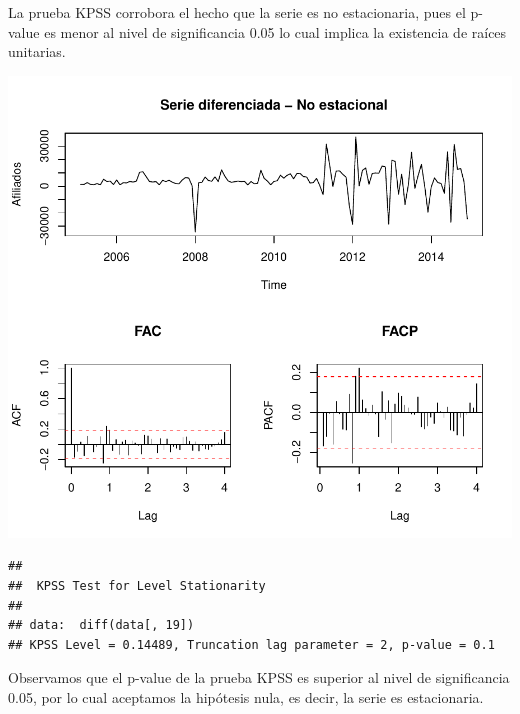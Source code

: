 \documentclass[11pt,a4paper,oneside]{article}\usepackage[]{graphicx}\usepackage[]{color}
\makeatletter
\def\maxwidth{ %
  \ifdim\Gin@nat@width>\linewidth
    \linewidth
  \else
    \Gin@nat@width
  \fi
}
\newenvironment{kframe}{%
 \def\at@end@of@kframe{}%
 \ifinner\ifhmode%
  \def\at@end@of@kframe{\end{minipage}}%
  \begin{minipage}{\columnwidth}%
 \fi\fi%
 \def\FrameCommand##1{\hskip\@totalleftmargin \hskip-\fboxsep
 \colorbox{shadecolor}{##1}\hskip-\fboxsep
     \hskip-\linewidth \hskip-\@totalleftmargin \hskip\columnwidth}%
 \MakeFramed {\advance\hsize-\width
   \@totalleftmargin\z@ \linewidth\hsize
   \@setminipage}}%
 {\par\unskip\endMakeFramed%
 \at@end@of@kframe}
\newenvironment{knitrout}{}{} %
\makeatother
\begin{document}
La prueba KPSS corrobora el hecho que la serie es no estacionaria, pues el p-value es menor al nivel de significancia 0.05 lo cual implica  la existencia de raíces unitarias.

\begin{knitrout}
\color{fgcolor}

{\centering \includegraphics[width=\maxwidth]{figure/unnamed-chunk-11-1} 

}



\end{knitrout}

\begin{knitrout}
\color{fgcolor}\begin{kframe}
\begin{verbatim}
## 
## 	KPSS Test for Level Stationarity
## 
## data:  diff(data[, 19])
## KPSS Level = 0.14489, Truncation lag parameter = 2, p-value = 0.1
\end{verbatim}
\end{kframe}
\end{knitrout}

Observamos que el p-value de la prueba KPSS es superior al nivel de significancia 0.05, por lo cual aceptamos la hipótesis nula, es decir, la serie es estacionaria.\newline
\end{document}

